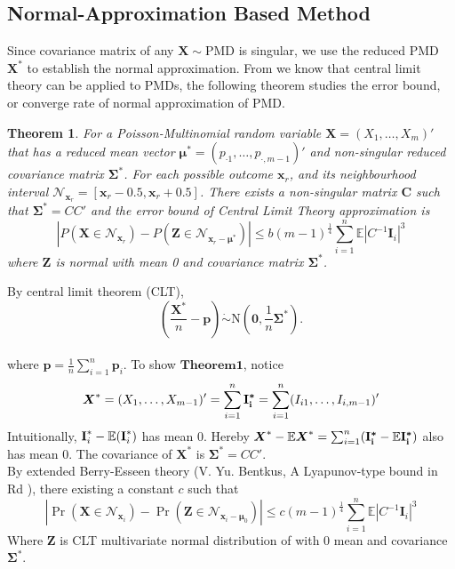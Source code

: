 \documentclass[12pt]{article}
\newcommand{\zerovec}{{\boldsymbol{0}}}
\newcommand{\EE}{\mathbb{E}}
\newcommand{\Xmat}{\mathbf{X}}
\newcommand{\pvec}{\boldsymbol{p}}
\newcommand{\N}{\textrm{N}}
\newcommand{\PMD}{\textrm{PMD}}
\newcommand{\Xvec}{\boldsymbol{X}}
\newcommand{\Sig}{\boldsymbol{\Sigma}}
\newcommand{\mvec}{\boldsymbol{\mu}}
\newtheorem{thm}{Theorem}
\begin{document}
\subsection{Normal-Approximation Based Method}
Since covariance matrix of any $\Xvec \sim \PMD$ is singular, we use the reduced $\PMD$ $\Xvec^{\ast}$ to establish the normal approximation. From   we know that central limit theory can be applied to $\PMD$s, the following theorem studies the error bound, or converge rate of normal approximation of $\PMD$.
\begin{thm}
For a Poisson-Multinomial random variable $\Xmat = (X_1,\dots,X_{m})'$ that has a reduced mean vector $\mvec^{\ast} = \left( p_{\cdot1} ,\dots,p_{\cdot,m-1}\right)'$ and non-singular reduced covariance matrix $\Sig^{\ast}$. For each possible outcome $\boldsymbol{\boldsymbol{x}}_r$, and its neighbourhood interval $\mathcal{N}_{\boldsymbol{\boldsymbol{x}}_r} = [\boldsymbol{\boldsymbol{x}}_r-0.5,\boldsymbol{\boldsymbol{x}}_r+0.5]$. There exists a non-singular matrix $\boldsymbol{C}$ such that $\Sig^{\ast} = CC'$ and the error bound of Central Limit Theory approximation is
\begin{equation*}
    |P(\Xmat \in \mathcal{N}_{\boldsymbol{x}_r}) - P(\boldsymbol{Z} \in \mathcal{N}_{\boldsymbol{x}_r-\mvec^{\ast}})| \leq b (m-1)^{\frac{1}{4}} \sum_{i=1}^{n}\EE|C^{-1}\boldsymbol{I}_{i}|^3
\end{equation*}
where $\boldsymbol{Z}$ is normal with mean 0 and covariance matrix $\Sig^{\ast}$.
\end{thm}
By central limit theorem (CLT),
$$\left(\frac{\Xvec^{\ast}}{n}-\pvec\right)\dot\sim \N\left(\zerovec, \frac{1}{n}\Sig^{\ast}\right).$$\\
where $\pvec = \frac{1}{n}\sum_{i=1}^{n}\pvec_i$.
To show $\mathbf{Theorem1}$, notice
\begin{align*}
    \Xvec^{\ast} = (X_1,\dots,X_{m-1})' = \sum_{i=1}^{n} \boldsymbol{\rm{I}_{i}^{\ast}}= \sum_{i=1}^{n} (I_{i1},\dots,I_{i,m-1})'
\end{align*}
Intuitionally, $\boldsymbol{\rm{I}}_i^{\ast} - \EE(\boldsymbol{\rm{I}}_i^{\ast})$ has mean 0. Hereby $\Xvec^{\ast} - \EE \Xvec^{\ast} = \sum_{i=1}^{n} (\boldsymbol{\rm{I}_i^{\ast}} - \EE \boldsymbol{\rm I_{i}^{\ast}})$ also has mean 0. The covariance of $\Xvec^{\ast}$ is $\Sig^{\ast} = CC'$.\\
By extended Berry-Esseen theory (V. Yu. Bentkus, A Lyapunov-type bound in Rd
), there existing  a constant $c$ such that
\begin{equation*}
    |\Pr\left(\Xmat \in \mathcal{N}_{\boldsymbol{x}_i}\right) - \Pr\left(\boldsymbol{Z} \in \mathcal{N}_{\boldsymbol{x}_i-\boldsymbol{\mu}_0} \right)| \leq c(m-1)^{\frac{1}{4}}\sum_{i=1}^{n} \EE \left|C^{-1}\boldsymbol{I}_i\right|^3
\end{equation*}
Where $\boldsymbol{Z}$ is CLT multivariate normal distribution of with 0 mean and covariance $\Sig^{\ast}$.
\end{document}
